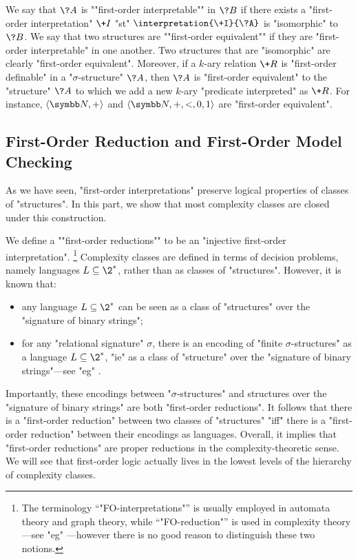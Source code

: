 We say that $\?A$ is \AP""first-order interpretable"" in $\?B$ if there exists
a "first-order interpretation" $\+I$ "st" $\interpretation{\+I}{\?A}$ is "isomorphic" to $\?B$.
We say that two structures are \AP""first-order equivalent"" if they are "first-order interpretable" in one another. Two structures that are "isomorphic" are clearly
"first-order equivalent". Moreover, if a $k$-ary relation $\+R$ is "first-order definable"
in a "$\sigma$-structure" $\?A$, then $\?A$ is "first-order equivalent" to the "structure"
$\?A$ to which we add a new $k$-ary "predicate interpreted" as $\+R$.
For instance, $\tup{\N, +}$ and $\tup{\N, +, <, 0, 1}$ are "first-order equivalent".

\subsection{First-Order Reduction and First-Order Model Checking}

As we have seen, "first-order interpretations" preserve logical properties of classes
of "structures". In this part, we show that most complexity classes
are closed under this construction.

We define a \AP""first-order reductions"" to be an "injective first-order interpretation".%
\footnote{The terminology ``"FO-interpretations"'' is usually employed in automata theory and graph theory, while ``"FO-reduction"'' is used in complexity theory---see "eg" \cite[Definition 2.11 \& Definition 1.26]{Immerman1998DescriptiveComplexity}---however there is no good reason to
distinguish these two notions.}
Complexity classes are defined in terms of decision problems, namely 
languages $L \subseteq \2^*$, rather than as classes of "structures". 
However, it is known that:
\begin{itemize}
	\item any language $L \subseteq \2^*$
		can be seen as a class of "structures" over the "signature of binary strings";
	\item for any "relational signature" $\sigma$,
		there is an encoding of "finite $\sigma$-structures" as a language
		$L \subseteq \2^*$, "ie" as a class of "structure" over the "signature of binary strings"---see "eg" \cite[\S~2.2]{Immerman1998DescriptiveComplexity}.
\end{itemize}
Importantly, these encodings between "$\sigma$-structures" and structures over
the "signature of binary strings" are both "first-order reductions".
It follows that there is a "first-order reduction" between two classes of "structures"
"iff" there is a "first-order reduction" between their encodings as languages.
Overall, it implies that "first-order reductions" are proper reductions in the complexity-theoretic 
sense. We will see that first-order logic actually lives in the lowest levels of the hierarchy of 
complexity classes.

